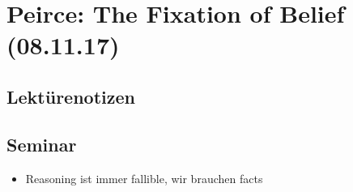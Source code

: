 \documentclass[emulatestandardclasses]{scrartcl}
\begin{document}
\section{Peirce: The Fixation of Belief\\(08.11.17)}

\subsection{Lektürenotizen}

\subsection{Seminar}

\begin{itemize}
  \item Reasoning ist immer fallible, wir brauchen facts
\end{itemize}

\newpage
%


\end{document}
